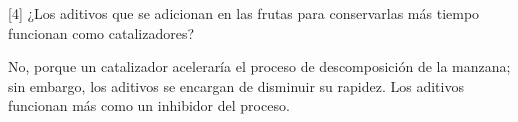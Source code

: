 [4] ¿Los aditivos que se adicionan en las frutas para conservarlas más tiempo funcionan como catalizadores?

\begin{solutionorlines}
    No, porque un catalizador aceleraría el proceso de descomposición de la manzana; sin embargo, los aditivos se encargan de disminuir su rapidez. Los aditivos funcionan más como un inhibidor del proceso.\end{solutionorlines}